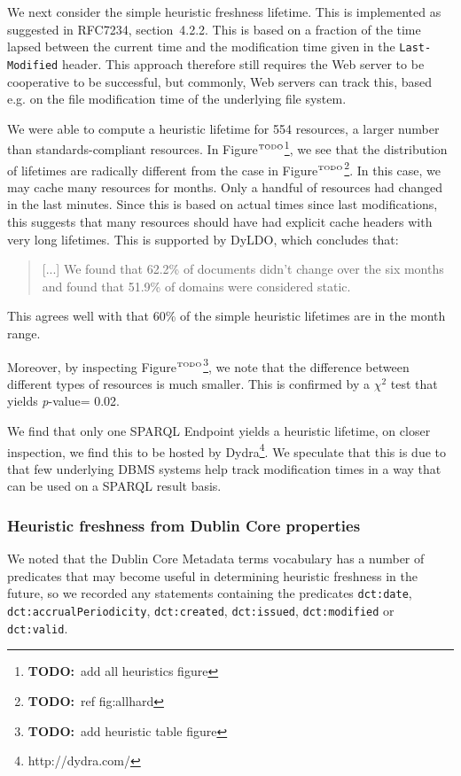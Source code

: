 \documentclass{llncs}
\newcommand{\rdfterm}[1]{\texttt{#1}}
\newcommand{\pvalue}{\textit{p}-value}
\newcommand{\httph}[1]{\texttt{#1}}
\newcommand{\todo}[1]{\ensuremath{^{\textrm{\tiny{TODO}\normalsize}}}\footnote{\textbf{TODO:}~#1}}
\begin{document}
We next consider the simple heuristic freshness lifetime. This is
implemented as suggested in RFC7234, section~4.2.2. This is based on a
fraction of the time lapsed between the current time and the
modification time given in the \httph{Last-Modified} header. This
approach therefore still requires the Web server to be cooperative to
be successful, but commonly, Web servers can track this, based e.g. on
the file modification time of the underlying file system.

We were able to compute a heuristic lifetime for 554 resources, a
larger number than standards-compliant resources. In Figure\todo{add all
  heuristics figure}, we see that the distribution of lifetimes are
radically different from the case in Figure\todo{ref fig:allhard}. In
this case, we may cache many resources for months. Only a handful of
resources had changed in the last minutes. Since this is based
on actual times since last modifications, this suggests that many
resources should have had explicit cache headers with very long
lifetimes. This is supported by DyLDO\cite{dyldo2}, which concludes that:
\begin{quote}
[...] We found that 62.2\% of documents didn’t change over the six
months and found that 51.9\% of domains were considered static.
\end{quote}
This agrees well with that 60\% of the simple heuristic lifetimes are
in the month range. 

Moreover, by inspecting Figure\todo{add heuristic table figure}, we
note that the difference between different types of resources is much
smaller. This is confirmed by a $\chi^2$ test that yields \pvalue =
0.02.

We find that only one SPARQL Endpoint yields a heuristic lifetime, on
closer inspection, we find this to be hosted by
Dydra\footnote{http://dydra.com/}. We speculate that this is due to
that few underlying DBMS systems help track modification times in a
way that can be used on a SPARQL result basis.

\subsubsection{Heuristic freshness from Dublin Core properties}

We noted that the Dublin Core Metadata terms vocabulary has a number
of predicates that may become useful in determining heuristic
freshness in the future, so we recorded any statements containing the
predicates \rdfterm{dct:date}, \rdfterm{dct:accrualPeriodicity},
\rdfterm{dct:created}, \rdfterm{dct:issued}, \rdfterm{dct:modified} or
\rdfterm{dct:valid}.
\end{document}
